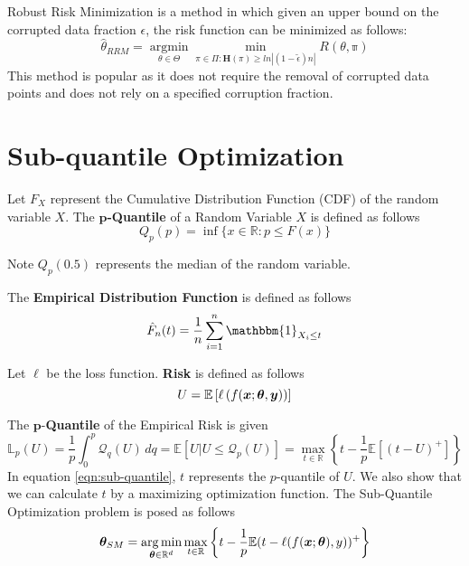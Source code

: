 \documentclass{article} %
\begin{document}
	Robust Risk Minimization \cite{RRM} is a method in which given an upper bound on the corrupted data fraction $\epsilon$, the risk function can be minimized as follows:
	\begin{equation}
		\hat{\mathbb{\theta}}_{RRM} = \operatorname*{argmin}_{\theta \in \Theta} \operatorname*{min}_{\pi \in \Pi: \mathbf{H}(\pi) \geq ln|(1-\tilde{\epsilon})n|} R(\mathbb{\theta,\pi})
	\end{equation}
	This method is popular as it does not require the removal of corrupted data points and does not rely on a specified corruption fraction.
		
	\section{Sub-quantile Optimization}
	\label{sec:sub-quantile-optimization}
	
	\begin{definition}
		Let $F_X$ represent the Cumulative Distribution Function (CDF) of the random variable $X$. The \textbf{$\mathbf{p}$-Quantile} of a Random Variable $X$ is defined as follows \vspace{1em}
		\begin{equation}
			Q_p(p) = \inf\{x\in\mathbb{R}: p \leq F(x)\} 
		\end{equation}
	\end{definition}

	Note $Q_p(0.5)$ represents the median of the random variable.
	
	\begin{definition}
		The \textbf{Empirical Distribution Function} is defined as follows
		\begin{equation}
			\hat{F}_n(t) = \frac{1}{n} \sum_{i=1}^n\mathbbm{1}_{X_i \leq t} 			
		\end{equation}
	\end{definition}
	
	\begin{definition}
		Let $\ell$ be the loss function. \textbf{Risk} is defined as follows
		\begin{equation}
			U = \mathbb{E}\left[\ell \left( f({\bm{x}};{\bm{\theta}},{\bm{y}})\right)\right]
		\end{equation}
	\end{definition}
	
	The $\mathbf{p}$-\textbf{Quantile} of the Empirical Risk is given
	\begin{equation}\label{eqn:sub-quantile}
		\mathbb{L}_p(U) = \frac{1}{p}\int_0^p \mathcal{Q}_q(U)\,dq = \mathbb{E}\left[U|U \leq \mathcal{Q}_p(U) \right] = \max_{t\in \mathbb{R}}\left\{t - \frac{1}{p}\mathbb{E}\left[(t-U)^+\right]\right\}
	\end{equation}
	In equation \ref{eqn:sub-quantile}, $t$ represents the $p$-quantile of $U$. We also show that we can calculate $t$ by a maximizing optimization function. 
	The Sub-Quantile Optimization problem is posed as follows
	\begin{equation}
		{\bm{\theta}}_{SM} = \operatorname*{arg\,min}_{{\bm{\theta}} \in \mathbb{R}^d} \max_{t \in \mathbb{R}} \left\{t - \frac{1}{p}\mathbb{E}(t - \ell(f({\bm{x}};{\bm{\theta}}),y))^+\right\}
	\end{equation}
	
\end{document}
